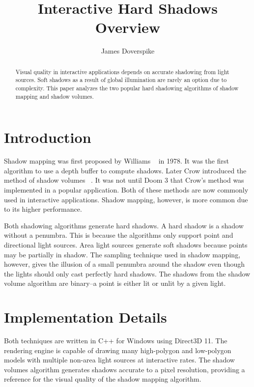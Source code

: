 \documentclass[12pt]{article}
\title{Interactive Hard Shadows Overview}
\author{James Doverspike}
\begin{document}
\maketitle

\begin{abstract}
Visual quality in interactive applications depends on accurate shadowing from light sources. Soft shadows as a result of global illumination are rarely an option due to complexity. This paper analyzes the two popular hard shadowing algorithms of shadow mapping and shadow volumes. 
\end{abstract}

\section{Introduction}

Shadow mapping was first proposed by Williams ~\cite{Williams:1978:CCS:800248.807402} in 1978. It was the first algorithm to use a depth buffer to compute shadows. Later Crow introduced the method of shadow volumes ~\cite{Crow:1977:SAC:563858.563901}. It was not until Doom 3 that Crow's method was implemented in a popular application. Both of these methods are now commonly used in interactive applications. Shadow mapping, however, is more common due to its higher performance.

Both shadowing algorithms generate hard shadows. A hard shadow is a shadow without a penumbra. This is because the algorithms only support point and directional light sources. Area light sources generate soft shadows because points may be partially in shadow. The sampling technique used in shadow mapping, however, gives the illusion of a small penumbra around the shadow even though the lights should only cast perfectly hard shadows.  The shadows from the shadow volume algorithm are binary--a point is either lit or unlit by a given light.

\section{Implementation Details}

Both techniques are written in C++ for Windows using Direct3D 11. The rendering engine is capable of drawing many high-polygon and low-polygon models with multiple non-area light sources at interactive rates. The shadow volumes algorithm generates shadows accurate to a pixel resolution, providing a reference for the visual quality of the shadow mapping algorithm.
\end{document}
